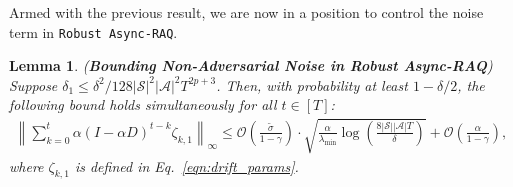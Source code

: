 \documentclass{article}
\newtheorem{lemma}{Lemma}
\begin{document}
Armed with the previous result, we are now in a position to control the noise term in \texttt{Robust Async-RAQ}. 
\begin{lemma}
\label{lemma:noise_bound_raq} (\textbf{Bounding Non-Adversarial Noise in Robust Async-RAQ})
Suppose \(\delta_1 \leq \delta^2/128 |\mathcal{S}|^2 |\mathcal{A}|^2 T^{2p+3}\). Then, with probability at least \(1 - \delta/2\), the following bound holds simultaneously for all \(t \in [T]\):
\begin{equation}
\begin{aligned}
    \left\lVert \sum_{k=0}^{t} \alpha (I - \alpha D)^{t-k} \zeta_{k,1} \right\rVert_\infty 
    \leq \mathcal{O}\left( \frac{ \tilde{\sigma} }{1 - \gamma} \right)
    \cdot \sqrt{ \frac{ \alpha }{ \lambda_{\min} } 
    \log \left( \frac{ 8 |\mathcal{S}| |\mathcal{A}| T }{ \delta } \right) } 
    + \mathcal{O}\left( \frac{ \alpha }{ 1 - \gamma } \right),
\end{aligned}
\end{equation}
where \(\zeta_{k,1}\) is defined in Eq.~\eqref{eqn:drift_params}.
\end{lemma}
\end{document}
